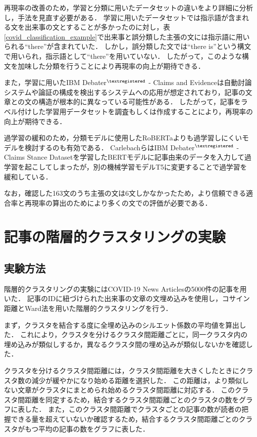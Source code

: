 \documentclass[12pt,a4j,dvipdfmx]{jreport}
\begin{document}
再現率の改善のため，学習と分類に用いたデータセットの違いをより詳細に分析し，手法を見直す必要がある．
学習に用いたデータセットでは指示語が含まれる文を出来事の文とすることが多かったのに対し，表\ref{covid_classification_example}で出来事と誤分類した主張の文には指示語に用いられる``there''が含まれていた．
しかし，誤分類した文では``there is''という構文で用いられ，指示語として``there''を用いていない．
したがって，このような構文を加味した分類を行うことにより再現率の向上が期待できる．

また，学習に用いたIBM Debater$^{\textregistered}$ - Claims and Evidenceは自動討論システムや論証の構成を検出するシステムへの応用が想定されており，記事の文章との文の構造が根本的に異なっている可能性がある．
したがって，記事をラベル付けした学習用データセットを調査もしくは作成することにより，再現率の向上が期待できる．

過学習の緩和のため，分類モデルに使用したRoBERTaよりも過学習しにくいモデルを検討するのも有効である．
CarlebachらはIBM Debater$^{\textregistered}$ - Claims Stance Datasetを学習したBERTモデルに記事由来のデータを入力して過学習を起こしてしまったが，別の機械学習モデルT5に変更することで過学習を緩和している\cite{carlebach_news_2020}．

なお，確認した163文のうち主張の文は6文しかなかったため，より信頼できる適合率と再現率の算出のためにより多くの文での評価が必要である．


\section{記事の階層的クラスタリングの実験}
\label{section_article_clustering_experiment}

\subsection{実験方法}

階層的クラスタリングの実験にはCOVID-19 News Articlesの5000件の記事を用いた．
記事のIDに紐づけられた出来事の文章の文埋め込みを使用し，コサイン距離とWard法を用いた階層的クラスタリングを行う．

まず，クラスタを結合する度に全埋め込みのシルエット係数の平均値を算出した．
これにより，クラスタを分けるクラスタ間距離ごとに，同一クラスタ内の埋め込みが類似しするか，異なるクラスタ間の埋め込みが類似しないかを確認した．

クラスタを分けるクラスタ間距離には，クラスタ間距離を大きくしたときにクラスタ数の減少が緩やかになり始める距離を選択した．
この距離は，より類似しない文章がクラスタにまとめられ始めるクラスタ間距離に対応する．
このクラスタ間距離を同定するため，結合するクラスタ間距離ごとのクラスタの数をグラフに表した．
また，このクラスタ間距離でクラスタごとの記事の数が読者の把握できる量を超えていないか確認するため，結合するクラスタ間距離ごとのクラスタがもつ平均の記事の数をグラフに表した．
\end{document}
